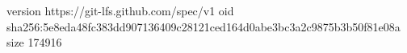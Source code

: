version https://git-lfs.github.com/spec/v1
oid sha256:5e8eda48fc383dd907136409c28121ced164d0abe3bc3a2c9875b3b50f81e08a
size 174916
